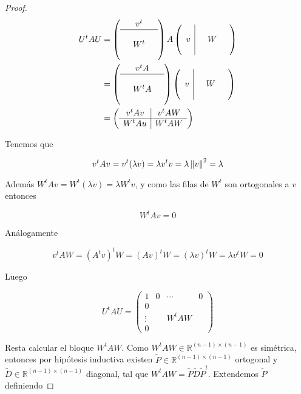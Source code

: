 \begin{propo}
\begin{proof}
\begin{align*}
U^t A U &= \left(\begin{array}{ccc}
& v^t& \\\hline
& & \\
& W^t & \\
& &
\end{array}\right) A \left(\begin{array}{c|ccc}
& & &\\
v& & W &\\
& & &
\end{array}\right)\\
&= \left(\begin{array}{ccc}
& v^t A& \\\hline
& & \\
& W^t A & \\
& &
\end{array}\right)\left(\begin{array}{c|ccc}
& & &\\
v& & W &\\
& & &
\end{array}\right)\\
&= \left(\begin{array}{c|c}
v^t A v & v^t A W\\\hline
W^t A u & W^t A W
\end{array}\right)
\end{align*}

Tenemos que

\[v^t A v = v^t (\lambda v) = \lambda v^t v = \lambda \left\lVert v\right\rVert^2 = \lambda\]

Además $W^tAv = W^t (\lambda v) = \lambda W^t v$, y como las filas de $W^t$ son ortogonales a $v$ entonces

\[W^t Av = 0\]

Análogamente

\[v^tAW = (A^tv)^tW = (Av)^tW = (\lambda v)^t W = \lambda v^t W = 0\]

Luego

\[U^t A U = \left(\begin{array}{c|ccc}
1 & 0 & \cdots & 0\\ \hline
0 & & & \\
\vdots & & W^tAW &\\
0 & & &
\end{array}\right)\]

Resta calcular el bloque $W^tAW$. Como $W^tAW \in \mathbb{R}^{(n - 1) \times (n - 1)}$ es simétrica, entonces por hipótesis inductiva existen $\tilde{P} \in \mathbb{R}^{(n - 1) \times (n - 1)}$ ortogonal y $\tilde{D} \in \mathbb{R}^{(n - 1) \times (n - 1)}$ diagonal, tal que $W^t A W = \tilde{P}\tilde{D}\tilde{P}^t$. Extendemos $\tilde{P}$ definiendo


\end{proof}
\end{propo}
